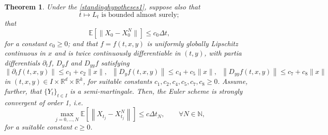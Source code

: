 \documentclass[reqno,12pt]{amsart}
\theoremstyle{plain} %
\newtheorem{theorem}{Theorem}[section]
\theoremstyle{definition} %
\begin{document}
\begin{theorem}
    \label{thmsemimartingale}
    Under the \cref{standinghypotheses1}, suppose also that
    \begin{equation}
        t \mapsto L_t \textrm{ is bounded almost surely};
    \end{equation}
    that 
    \begin{equation}
        \mathbb{E}\left[\|X_0 - X_0^N\|\right] \leq c_0\Delta t,
    \end{equation}
    for a constant $c_0 \geq 0$; and that $f=f(t, x, y)$ is uniformly globally Lipschitz continuous in $x$ and is twice continuously differentiable in $(t, y)$, with partia differentials $\partial_t f$, $D_y f$ and $D_{yy} f$ satisfying
    \begin{equation}
        \label{ftfylineargrowthsemimartingale}
        \left\|\partial_t f(t, x, y)\right\| \leq c_1 + c_2 \|x\|, \;\; \left\|D_y f(t, x, y)\right\| \leq c_4 + c_5\|x\|, \;\; \left\|D_{yy} f(t, x, y)\right\| \leq c_7 + c_8\|x\|
    \end{equation}
    in $(t, x, y)\in I\times \mathbb{R}^d\times \mathbb{R}^k$, for suitable constants $c_1, c_2, c_4, c_5, c_7, c_8 \geq 0$. Assume, further, that $\{Y_t\}_{t\in I}$ is a semi-martingale. Then, the Euler scheme is strongly convergent of order 1, i.e.
    \begin{equation}
        \label{ordersemimartingale}
        \max_{j=0, \ldots, N} \mathbb{E}\left[\left\| X_{t_j} - X_{t_j}^N \right\|\right] \leq c \Delta t_N, \qquad \forall N \in \mathbb{N},
    \end{equation}
    for a suitable constant $c\geq 0$.
\end{theorem}
\end{document}
